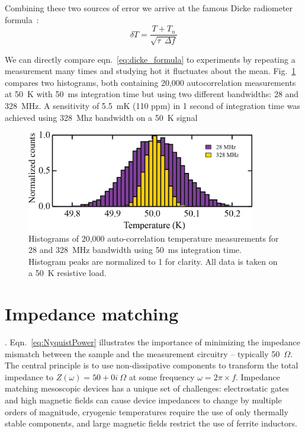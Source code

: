 Combining these two sources of error we arrive at the famous Dicke radiometer formula~\cite{dicke_measurement_1946}:
\begin{equation}\label{eq:dicke_formula}
\delta T = \frac{T+T_n}{\sqrt{\tau~~\Delta f}}
\end{equation}

We can directly compare eqn.~\ref{eq:dicke_formula} to experiments by repeating a measurement many times and studying hot it fluctuates about the mean. Fig.~\ref{fig:JNT_histograms} compares two histograms, both containing 20,000 autocorrelation measurements at 50~K with 50~ms integration time but using two different bandwidths: 28 and 328~MHz. A sensitivity of 5.5~mK (110 ppm) in 1 second of integration time was achieved using 328~Mhz bandwidth on a 50~K signal
\begin{figure}
\centering
\includegraphics[width = 100mm]{figures/Johnson_noise_thermometry/histograms.png}
\caption{Histograms of 20,000 auto-correlation temperature measurements for 28 and 328~MHz bandwidth using 50~ms integration time. Histogram peaks are normalized to 1 for clarity. All data is taken on a 50~K resistive load.}
\label{fig:JNT_histograms}
\end{figure}

\section{Impedance matching}\label{section:matching}
. Eqn.~\ref{eq:NyquistPower} illustrates the importance of minimizing the impedance mismatch between the sample and the measurement circuitry -- typically 50~$\Omega$. The central principle is to use non-dissipative components to transform the total impedance to $Z(\omega) = 50+0i~\Omega$ at some frequency $\omega = 2\pi\times f$. Impedance matching mesoscopic devices has a unique set of challenges: electrostatic gates and high magnetic fields can cause device impedances to change by multiple orders of magnitude, cryogenic temperatures require the use of only thermally stable components, and large magnetic fields restrict the use of ferrite inductors.

